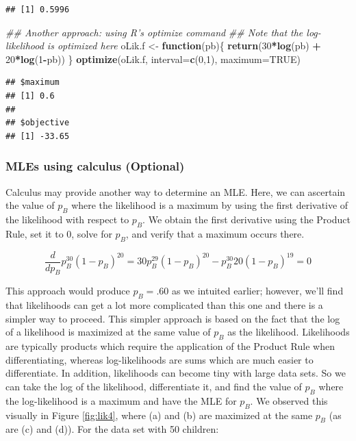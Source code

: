 \documentclass[
]{krantz}
\newenvironment{Shaded}{\begin{snugshade}}{\end{snugshade}}
\newcommand{\CommentTok}[1]{\textcolor[rgb]{0.37,0.37,0.37}{\textit{#1}}}
\newcommand{\ControlFlowTok}[1]{\textcolor[rgb]{0.27,0.27,0.27}{\textbf{#1}}}
\newcommand{\DataTypeTok}[1]{\textcolor[rgb]{0.27,0.27,0.27}{#1}}
\newcommand{\DecValTok}[1]{\textcolor[rgb]{0.06,0.06,0.06}{#1}}
\newcommand{\KeywordTok}[1]{\textcolor[rgb]{0.27,0.27,0.27}{\textbf{#1}}}
\newcommand{\NormalTok}[1]{#1}
\newcommand{\OperatorTok}[1]{\textcolor[rgb]{0.43,0.43,0.43}{\textbf{#1}}}
\newcommand{\OtherTok}[1]{\textcolor[rgb]{0.37,0.37,0.37}{#1}}
\newcommand{\StringTok}[1]{\textcolor[rgb]{0.5,0.5,0.5}{#1}}
\begin{document}
\begin{verbatim}
## [1] 0.5996
\end{verbatim}

\begin{Shaded}
\begin{Highlighting}[]
\CommentTok{## Another approach: using R's optimize command}
\CommentTok{##   Note that the log-likelihood is optimized here}
\NormalTok{oLik.f <-}\StringTok{ }\ControlFlowTok{function}\NormalTok{(pb)\{}
    \KeywordTok{return}\NormalTok{(}\DecValTok{30}\OperatorTok{*}\KeywordTok{log}\NormalTok{(pb) }\OperatorTok{+}\StringTok{ }\DecValTok{20}\OperatorTok{*}\KeywordTok{log}\NormalTok{(}\DecValTok{1}\OperatorTok{-}\NormalTok{pb))}
\NormalTok{  \}}
\KeywordTok{optimize}\NormalTok{(oLik.f, }\DataTypeTok{interval=}\KeywordTok{c}\NormalTok{(}\DecValTok{0}\NormalTok{,}\DecValTok{1}\NormalTok{), }\DataTypeTok{maximum=}\OtherTok{TRUE}\NormalTok{)}
\end{Highlighting}
\end{Shaded}

\begin{verbatim}
## $maximum
## [1] 0.6
## 
## $objective
## [1] -33.65
\end{verbatim}

\hypertarget{calc-sec}{%
\subsubsection{MLEs using calculus (Optional)}\label{calc-sec}}

Calculus may provide another way to determine an MLE. Here, we can ascertain the value of \(p_B\) where the likelihood is a maximum by using the first derivative of the likelihood with respect to \(p_B\). We obtain the first derivative using the Product Rule, set it to 0, solve for \(p_B\), and verify that a maximum occurs there.

\begin{equation*}
\frac{d}{dp_B}p_B^{30}(1-p_B)^{20} = 30p_B^{29}(1-p_B)^{20}-p^{30}_B20(1-p_B)^{19} = 0
\end{equation*}

This approach would produce \(p_B = .60\) as we intuited earlier; however, we'll find that likelihoods can get a lot more complicated than this one and there is a simpler way to proceed. This simpler approach is based on the fact that the log of a likelihood is maximized at the same value of \(p_B\) as the likelihood. Likelihoods are typically products which require the application of the Product Rule when differentiating, whereas log-likelihoods are sums which are much easier to differentiate. In addition, likelihoods can become tiny with large data sets. So we can take the log of the likelihood, differentiate it, and find the value of \(p_B\) where the log-likelihood is a maximum and have the MLE for \(p_B\). We observed this visually in Figure \ref{fig:lik4}, where (a) and (b) are maximized at the same \(p_B\) (as are (c) and (d)). For the data set with 50 children:
\end{document}

